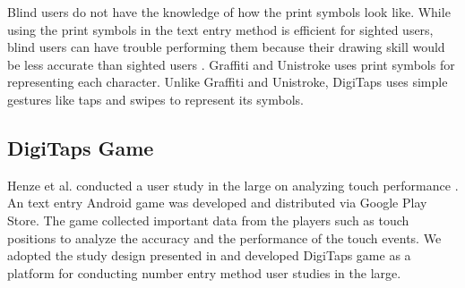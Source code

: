 Blind users do not have the knowledge of how the print symbols look like. While using the print symbols in the text entry method is efficient for sighted users, blind users can have trouble performing them because their drawing skill would be less accurate than sighted users \cite{Kane:2011}. Graffiti and Unistroke \cite{Goldberg:1993} uses print symbols for representing each character. Unlike Graffiti and Unistroke, DigiTaps uses simple gestures like taps and swipes to represent its symbols.

\subsection{DigiTaps Game}
Henze et al. conducted a user study in the large on analyzing touch performance \cite{Henze:2011}. An text entry Android game was developed and distributed via Google Play Store. The game collected important data from the players such as touch positions to analyze the accuracy and the performance of the touch events. We adopted the study design presented in \cite{Henze:2012} and developed DigiTaps game as a platform for conducting number entry method user studies in the large.
